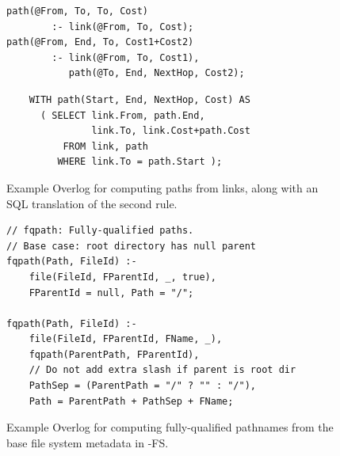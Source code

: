 \begin{figure}[t]
\begin{small}
\begin{verbatim}
path(@From, To, To, Cost) 
        :- link(@From, To, Cost);
path(@From, End, To, Cost1+Cost2)
        :- link(@From, To, Cost1),
           path(@To, End, NextHop, Cost2);
\end{verbatim}
\end{small}
\begin{small}
\begin{verbatim}
	WITH path(Start, End, NextHop, Cost) AS
	  ( SELECT link.From, path.End, 
	           link.To, link.Cost+path.Cost
	      FROM link, path
	     WHERE link.To = path.Start );
\end{verbatim}
\end{small}
\vspace{-12pt}
\caption{Example Overlog for computing paths from links, along with an SQL translation of the second rule.}
\label{fig:datalogsql}
\end{figure}

\begin{figure}[t]
\centering
\begin{small}
\begin{verbatim}
// fqpath: Fully-qualified paths.
// Base case: root directory has null parent
fqpath(Path, FileId) :-
    file(FileId, FParentId, _, true),
    FParentId = null, Path = "/";

fqpath(Path, FileId) :-
    file(FileId, FParentId, FName, _),
    fqpath(ParentPath, FParentId),
    // Do not add extra slash if parent is root dir
    PathSep = (ParentPath = "/" ? "" : "/"),
    Path = ParentPath + PathSep + FName;
\end{verbatim}
\end{small}
\vspace{-12pt}
\caption{Example Overlog for computing fully-qualified pathnames from
  the base file system metadata in \BOOM-FS.}
\label{fig:bfs-path}
\vspace{-12pt}
\end{figure}

